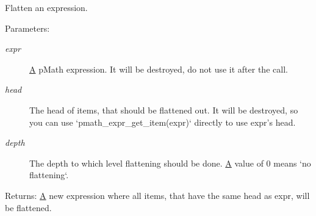 Flatten an expression. 

\begin{Desc}
\item[Parameters:]
\begin{description}
\item[{\em expr}]\hyperlink{class_a}{A} pMath expression. It will be destroyed, do not use it after the call. \item[{\em head}]The head of items, that should be flattened out. It will be destroyed, so you can use `pmath\_\-expr\_\-get\_\-item(expr)` directly to use expr's head. \item[{\em depth}]The depth to which level flattening should be done. \hyperlink{class_a}{A} value of 0 means `no flattening`. \end{description}
\end{Desc}
\begin{Desc}
\item[Returns:]\hyperlink{class_a}{A} new expression where all items, that have the same head as expr, will be flattened. \end{Desc}
